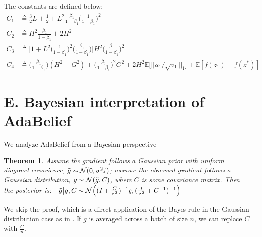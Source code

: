 \documentclass{article}
\newtheorem{theorem}{Theorem}[section]
\begin{document}
The constants are defined below:
\begin{align}
\label{supeq:constants}
C_1 & \triangleq \frac{3}{2} L + \frac{1}{2} + L^2 \frac{\beta_1}{1-\beta_1} \big( \frac{1}{1-\beta_1} \big)^2 \\
C_2 & \triangleq H^2 \frac{\beta_1}{ 1 - \beta_1} + 2H^2 \\
C_3 & \triangleq \Big[ 1 + L^2 \big(\frac{1}{1-\beta_1}\big)^2 \big( \frac{\beta_1}{1-\beta_1} \big) \Big]H^2 \big( \frac{\beta_1}{1 - \beta_1} \big)^2 \\
C_4 &\triangleq \big( \frac{\beta_1}{ 1 - \beta_1} \big) (H^2 + G^2) + \big( \frac{\beta_1}{1 - \beta_1} \big)^2 G^2 + 2H^2 \mathbb{E}\big[  \vert  \vert \alpha_1 / \sqrt{v_1}  \vert      \vert_1 \big] + \mathbb{E} [f(z_1) - f(z^*)]
\end{align} \hfill \qedsymbol

\section*{E. Bayesian interpretation of AdaBelief} We analyze AdaBelief from a Bayesian perspective.
\label{subsec:natural}

\begin{theorem}
\label{theorem:NAG}
Assume the gradient follows a Gaussian prior with uniform diagonal covariance, $\Tilde{g} \sim \mathcal{N}(0, \sigma^2 I)$; assume the observed gradient follows a Gaussian distribution, $g \sim \mathcal{N}(\Tilde{g}, C)$, where $C$ is some covariance matrix. Then the posterior is:\ \ 
$
\label{eq:posterior}
\Tilde{g} \big \vert g, C \sim \mathcal{N} \Big( (I + \frac{C}{\sigma^2})^{-1} g, (\frac{I}{\sigma^2} + C^{-1})^{-1} \Big)
$
\end{theorem}
We skip the proof, which is a direct application of the Bayes rule in the Gaussian distribution case as in \cite{roux2008topmoumoute}. If $g$ is averaged across a batch of size $n$, we can replace $C$ with $\frac{C}{n}$.
\end{document}
